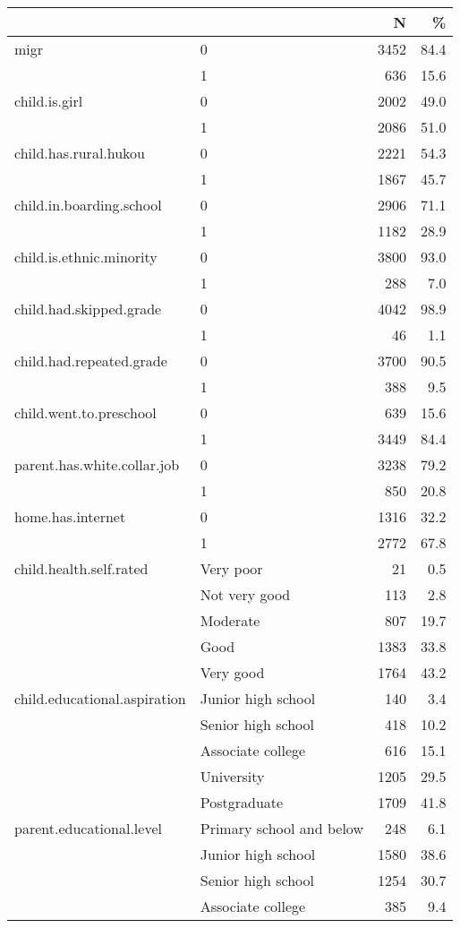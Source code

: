 \documentclass[
  man,floatsintext]{apa7}
\begin{document}
\begin{longtable}[]{@{}llrr@{}}
\toprule
& & N & \% \\
\midrule
\endhead
migr & 0 & 3452 & 84.4 \\
& 1 & 636 & 15.6 \\
child.is.girl & 0 & 2002 & 49.0 \\
& 1 & 2086 & 51.0 \\
child.has.rural.hukou & 0 & 2221 & 54.3 \\
& 1 & 1867 & 45.7 \\
child.in.boarding.school & 0 & 2906 & 71.1 \\
& 1 & 1182 & 28.9 \\
child.is.ethnic.minority & 0 & 3800 & 93.0 \\
& 1 & 288 & 7.0 \\
child.had.skipped.grade & 0 & 4042 & 98.9 \\
& 1 & 46 & 1.1 \\
child.had.repeated.grade & 0 & 3700 & 90.5 \\
& 1 & 388 & 9.5 \\
child.went.to.preschool & 0 & 639 & 15.6 \\
& 1 & 3449 & 84.4 \\
parent.has.white.collar.job & 0 & 3238 & 79.2 \\
& 1 & 850 & 20.8 \\
home.has.internet & 0 & 1316 & 32.2 \\
& 1 & 2772 & 67.8 \\
child.health.self.rated & Very poor & 21 & 0.5 \\
& Not very good & 113 & 2.8 \\
& Moderate & 807 & 19.7 \\
& Good & 1383 & 33.8 \\
& Very good & 1764 & 43.2 \\
child.educational.aspiration & Junior high school & 140 & 3.4 \\
& Senior high school & 418 & 10.2 \\
& Associate college & 616 & 15.1 \\
& University & 1205 & 29.5 \\
& Postgraduate & 1709 & 41.8 \\
parent.educational.level & Primary school and below & 248 & 6.1 \\
& Junior high school & 1580 & 38.6 \\
& Senior high school & 1254 & 30.7 \\
& Associate college & 385 & 9.4 \\

\end{longtable}
\end{document}
